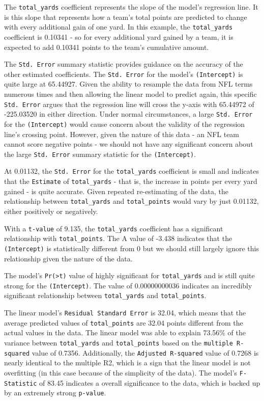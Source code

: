 \documentclass[
  letterpaper,
]{krantz}
\begin{document}
The \texttt{total\_yards} coefficient represents the slope of the
model's regression line. It is this slope that represents how a team's
total points are predicted to change with every additional gain of one
yard. In this example, the \texttt{total\_yards} coefficient is 0.10341
- so for every additional yard gained by a team, it is expected to add
0.10341 points to the team's cumulative amount.

The \texttt{Std.\ Error} summary statistic provides guidance on the
accuracy of the other estimated coefficients. The \texttt{Std.\ Error}
for the model's \texttt{(Intercept)} is quite large at 65.44927. Given
the ability to resample the data from NFL terms numerous times and then
allowing the linear model to predict again, this specific
\texttt{Std.\ Error} argues that the regression line will cross the
y-axis with 65.44972 of -225.03520 in either direction. Under normal
circumstances, a large \texttt{Std.\ Error} for the \texttt{(Intercept)}
would cause concern about the validity of the regression line's crossing
point. However, given the nature of this data - an NFL team cannot score
negative points - we should not have any significant concern about the
large \texttt{Std.\ Error} summary statistic for the
\texttt{(Intercept)}.

At 0.01132, the \texttt{Std.\ Error} for the \texttt{total\_yards}
coefficient is small and indicates that the \texttt{Estimate} of
\texttt{total\_yards} - that is, the increase in points per every yard
gained - is quite accurate. Given repeated re-estimating of the data,
the relationship between \texttt{total\_yards} and
\texttt{total\_points} would vary by just 0.01132, either positively or
negatively.

With a \texttt{t-value} of 9.135, the \texttt{total\_yards} coefficient
has a significant relationship with \texttt{total\_points}. The A value
of -3.438 indicates that the \texttt{(Intercept)} is statistically
different from 0 but we should still largely ignore this relationship
given the nature of the data.

The model's \texttt{Pr(\textgreater{}\textbar{}t\textbar{})} value of
highly significant for \texttt{total\_yards} and is still quite strong
for the \texttt{(Intercept)}. The value of 0.00000000036 indicates an
incredibly significant relationship between \texttt{total\_yards} and
\texttt{total\_points}.

The linear model's \texttt{Residual\ Standard\ Error} is 32.04, which
means that the average predicted values of \texttt{total\_points} are
32.04 points different from the actual values in the data. The linear
model was able to explain 73.56\% of the variance between
\texttt{total\_yards} and \texttt{total\_points} based on the
\texttt{multiple\ R-squared} value of 0.7356. Additionally, the
\texttt{Adjusted\ R-squared} value of 0.7268 is nearly identical to the
multiple R2, which is a sign that the linear model is not overfitting
(in this case because of the simplicity of the data). The model's
\texttt{F-Statistic} of 83.45 indicates a overall significance to the
data, which is backed up by an extremely strong \texttt{p-value}.
\end{document}
